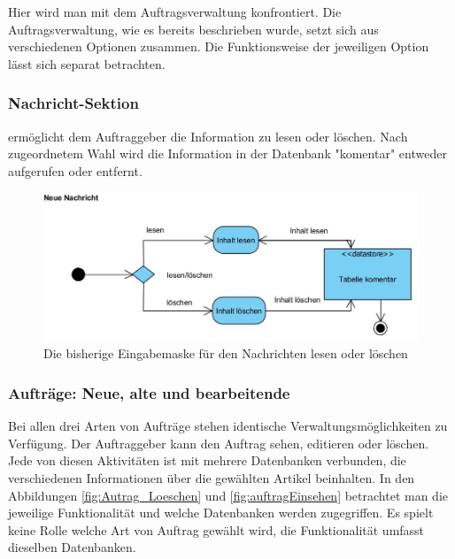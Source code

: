 Hier wird man mit dem Auftragsverwaltung konfrontiert. Die Auftragsverwaltung, wie es bereits beschrieben wurde, setzt sich aus verschiedenen Optionen zusammen. Die Funktionsweise der jeweiligen Option lässt sich separat betrachten. 
	
\subsubsection{Nachricht-Sektion} ermöglicht dem Auftraggeber die Information zu lesen oder löschen. Nach zugeordnetem Wahl wird die Information in der Datenbank "komentar" entweder aufgerufen oder entfernt. 

\begin{figure}[h]
	\centering
	\includegraphics[width=0.8\linewidth]{Graphics/NeueNachricht.JPG}
	\caption[Kommunikation]{Die bisherige Eingabemaske für den Nachrichten lesen oder löschen}
	\label{fig:Kommunikation}
\end{figure}



\subsubsection{Aufträge: Neue, alte und bearbeitende}

Bei allen drei Arten von Aufträge stehen identische Verwaltungsmöglichkeiten zu Verfügung. Der Auftraggeber kann den Auftrag sehen, editieren oder löschen. Jede von diesen Aktivitäten ist mit mehrere Datenbanken verbunden, die verschiedenen Informationen über die gewählten Artikel beinhalten. In den Abbildungen \ref{fig:Autrag_Loeschen} und \ref{fig:auftragEinsehen} betrachtet man die jeweilige Funktionalität und welche Datenbanken werden zugegriffen. Es spielt keine Rolle welche Art von Auftrag gewählt wird, die Funktionalität umfasst dieselben Datenbanken.


